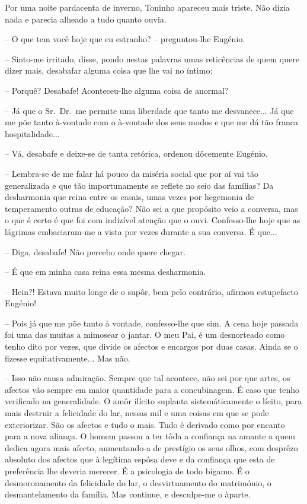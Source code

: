 \documentclass[9pt]{article}
\begin{document}
Por uma noite pardacenta de inverno, Toninho apareceu mais triste. Não
dizia nada e parecia a\-lheado a tudo quanto ouvia.

-- O que tem você hoje que eu estranho? -- preguntou-\-lhe Eugé\-nio.

-- Sinto-me irritado, disse, pondo nestas palavras umas reticências de
quem quere  dizer mais, desabafar alguma coisa que lhe vai no ín\-timo:

-- Porquê? Desabafe! Aconteceu-\-lhe alguma coisa de anormal?

-- Já que o Sr.\ Dr.\ me permite uma liberdade que tanto me desvanece...
Já que me põe tanto à-vontade com o à-vontade dos seus modos e que me dá
tão franca hospitalidade...

-- Vá, desabafe e deixe-se de tanta retórica, ordenou dôcemente Eugé\-nio.

-- Lembra-se de me falar há pouco da miséria social que por aí vai
tão generalizada e que tão importunamente se reflete no seio das fa\-mí\-lias?
Da desharmonia que reina entre os casais, umas vezes por hegemonia de temperamento outras de educa\-ção?
 Não sei a que propósito veio a conversa,
mas o que é certo é que foi com indizível aten\-ção que o ouvi. Confesso-\-lhe
hoje que as lágrimas embaciaram-me a vista por vezes durante a sua conversa.
É que...

-- Diga, desabafe! Não percebo onde quere chegar.

-- É que em minha casa reina essa mesma desharmonia.

-- Hein?! Estava muito longe de o supôr, bem pelo contrário, afirmou estupefacto Eugé\-nio!

-- Pois já que me põe tanto à vontade, confesso-\-lhe que sim. A cena hoje
passada foi uma das muitas a mimosear o jantar. O meu Pai, é um desnorteado
como tenho dito por vezes, que divide os afectos e encargos por duas
casas. Ainda se o fizesse equitativamente... Mas não.

-- Isso não causa admira\-ção. Sempre que tal acontece, não sei por que artes, os afectos vão sempre em maior quantidade para a concubinagem. É
caso que tenho verifi\-cado na generalidade. O amôr ilícito suplanta sistemáticamente o lícito, para mais destruir a felicidade do lar, nessas mil e
uma coisas em que se pode exteriorizar. São os afectos e tudo o mais. Tudo é
derivado como por encanto para a nova alian\-ça. O homem passou a ter tôda a confian\-ça na amante a quem dedica agora mais afecto, aumentando-a de
prestígio os seus o\-lhos, com desprêzo absoluto dos afectos que à legítima
espôsa deve e da confian\-ça que esta de preferência lhe deveria merecer. É
a psicologia de todo bígamo. É o desmoronamento da felicidade do lar, o
desvirtuamento do matrimónio, o desmantelamento da fa\-mí\-lia.
%
Mas continue, e desculpe-me o àparte.
\end{document}
